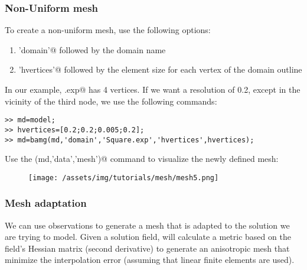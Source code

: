 \subsubsection{Non-Uniform mesh}%
To create a non-uniform mesh, use the following options:
\begin{enumerate}
	\item \verb@'domain'@ followed by the domain name
	\item \verb@'hvertices'@ followed by the element size for each vertex of the domain outline
\end{enumerate}
In our example, \verb@Square.exp@ has 4 vertices. If we want a resolution of 0.2, except in the vicinity of the third node, we use the following commands:
\begin{verbatim}>> md=model;
>> hvertices=[0.2;0.2;0.005;0.2];
>> md=bamg(md,'domain','Square.exp','hvertices',hvertices);
\end{verbatim}
Use the \verb@plotmodel(md,'data','mesh')@ command to visualize the newly defined mesh:
\begin{figure}[H]
	\begin{center}
		\texttt{[image: /assets/img/tutorials/mesh/mesh5.png]}
	\end{center}
\end{figure}
\subsubsection{Mesh adaptation}%
We can use observations to generate a mesh that is adapted to the solution we are trying to model. Given a solution field, \verb@bamg@ will calculate a metric based on the field's Hessian matrix (second derivative) to generate an anisotropic mesh that minimize the interpolation error (assuming that linear finite elements are used).

